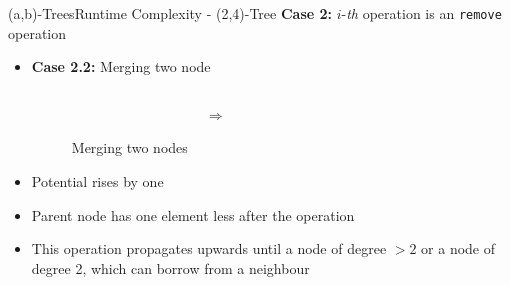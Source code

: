 \begin{frame}{(a,b)-Trees}{Runtime Complexity - (2,4)-Tree}
  \textbf{Case 2:}
  {\color{MainA}$i$}-\textit{th} operation is an
  \texttt{\color{MainA}remove} operation
  \begin{itemize}
    \item<2->
      \textbf{Case 2.2:} Merging two node
      \begin{figure}
          \begin{columns}
          \begin{column}{0.35\linewidth}
            \begin{adjustbox}{width=\linewidth}
              
            \end{adjustbox}
          \end{column}
          \begin{column}{0.1\linewidth}
            \begin{center}
              $\Rightarrow$
            \end{center}
          \end{column}
          \begin{column}{0.35\linewidth}
            \begin{adjustbox}{width=0.85\linewidth}
              
            \end{adjustbox}
          \end{column}
        \end{columns}
        \caption{Merging two nodes}
        \label{fig:a_b_tree:merge_potential}
      \end{figure}
    \item<3->
      Potential rises by one
    \item<4->
      Parent node has one element less after the operation
    \item<5->
      This operation propagates upwards until a node of degree $> 2$
      or a node of degree 2, which can borrow from a neighbour
  \end{itemize}
\end{frame}



